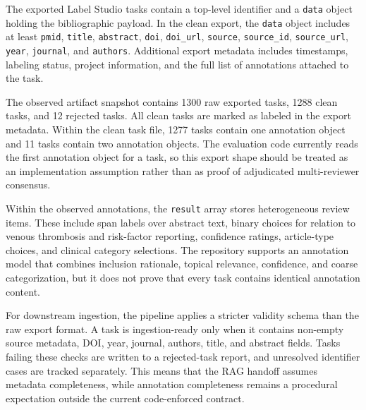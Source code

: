 The exported Label Studio tasks contain a top-level identifier and a \texttt{data} object holding the bibliographic payload. In the clean export, the \texttt{data} object includes at least \texttt{pmid}, \texttt{title}, \texttt{abstract}, \texttt{doi}, \texttt{doi\_url}, \texttt{source}, \texttt{source\_id}, \texttt{source\_url}, \texttt{year}, \texttt{journal}, and \texttt{authors}. Additional export metadata includes timestamps, labeling status, project information, and the full list of annotations attached to the task.

The observed artifact snapshot contains 1300 raw exported tasks, 1288 clean tasks, and 12 rejected tasks. All clean tasks are marked as labeled in the export metadata. Within the clean task file, 1277 tasks contain one annotation object and 11 tasks contain two annotation objects. The evaluation code currently reads the first annotation object for a task, so this export shape should be treated as an implementation assumption rather than as proof of adjudicated multi-reviewer consensus.

Within the observed annotations, the \texttt{result} array stores heterogeneous review items. These include span labels over abstract text, binary choices for relation to venous thrombosis and risk-factor reporting, confidence ratings, article-type choices, and clinical category selections. The repository supports an annotation model that combines inclusion rationale, topical relevance, confidence, and coarse categorization, but it does not prove that every task contains identical annotation content.

For downstream ingestion, the pipeline applies a stricter validity schema than the raw export format. A task is ingestion-ready only when it contains non-empty source metadata, DOI, year, journal, authors, title, and abstract fields. Tasks failing these checks are written to a rejected-task report, and unresolved identifier cases are tracked separately. This means that the RAG handoff assumes metadata completeness, while annotation completeness remains a procedural expectation outside the current code-enforced contract.

